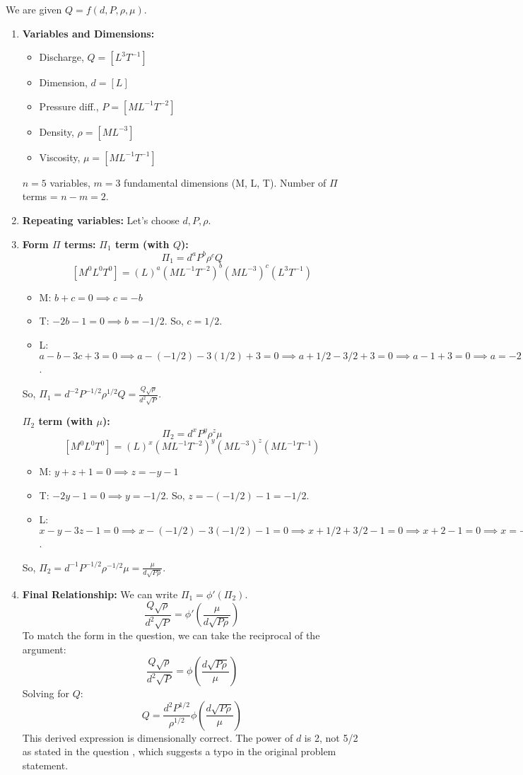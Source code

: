 \documentclass{article}
\begin{document}
We are given $Q = f(d, P, \rho, \mu)$.
\begin{enumerate}
    \item \textbf{Variables and Dimensions:}
    \begin{itemize}
        \item Discharge, $Q = [L^3T^{-1}]$
        \item Dimension, $d = [L]$
        \item Pressure diff., $P = [ML^{-1}T^{-2}]$
        \item Density, $\rho = [ML^{-3}]$
        \item Viscosity, $\mu = [ML^{-1}T^{-1}]$
    \end{itemize}
    $n=5$ variables, $m=3$ fundamental dimensions (M, L, T). Number of $\Pi$ terms = $n-m=2$.
    
    \item \textbf{Repeating variables:} Let's choose $d, P, \rho$.
    
    \item \textbf{Form $\Pi$ terms:}
    \textbf{$\Pi_1$ term (with $Q$):}
    $$ \Pi_1 = d^a P^b \rho^c Q $$
    $$ [M^0L^0T^0] = (L)^a (ML^{-1}T^{-2})^b (ML^{-3})^c (L^3T^{-1}) $$
    \begin{itemize}
        \item M: $b+c = 0 \implies c = -b$
        \item T: $-2b-1 = 0 \implies b = -1/2$. So, $c=1/2$.
        \item L: $a-b-3c+3=0 \implies a - (-1/2) - 3(1/2) + 3 = 0 \implies a+1/2-3/2+3=0 \implies a-1+3=0 \implies a=-2$.
    \end{itemize}
    So, $\Pi_1 = d^{-2} P^{-1/2} \rho^{1/2} Q = \frac{Q\sqrt{\rho}}{d^2\sqrt{P}}$.
    
    \textbf{$\Pi_2$ term (with $\mu$):}
    $$ \Pi_2 = d^x P^y \rho^z \mu $$
    $$ [M^0L^0T^0] = (L)^x (ML^{-1}T^{-2})^y (ML^{-3})^z (ML^{-1}T^{-1}) $$
    \begin{itemize}
        \item M: $y+z+1=0 \implies z = -y-1$
        \item T: $-2y-1=0 \implies y = -1/2$. So, $z=-(-1/2)-1 = -1/2$.
        \item L: $x-y-3z-1=0 \implies x - (-1/2) - 3(-1/2) - 1 = 0 \implies x+1/2+3/2-1=0 \implies x+2-1=0 \implies x=-1$.
    \end{itemize}
    So, $\Pi_2 = d^{-1} P^{-1/2} \rho^{-1/2} \mu = \frac{\mu}{d\sqrt{P\rho}}$.
    
    \item \textbf{Final Relationship:}
    We can write $\Pi_1 = \phi'(\Pi_2)$.
    $$ \frac{Q\sqrt{\rho}}{d^2\sqrt{P}} = \phi'\left(\frac{\mu}{d\sqrt{P\rho}}\right) $$
    To match the form in the question, we can take the reciprocal of the argument:
    $$ \frac{Q\sqrt{\rho}}{d^2\sqrt{P}} = \phi\left(\frac{d\sqrt{P\rho}}{\mu}\right) $$
    Solving for $Q$:
    $$ Q = \frac{d^2 P^{1/2}}{\rho^{1/2}}\phi\left(\frac{d\sqrt{P\rho}}{\mu}\right) $$
    This derived expression is dimensionally correct. The power of $d$ is 2, not 5/2 as stated in the question , which suggests a typo in the original problem statement.
\end{enumerate}
\hrulefill
\end{document}
